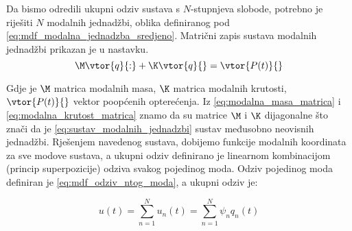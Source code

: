 Da bismo odredili ukupni odziv sustava s $N$-stupnjeva slobode, potrebno je riješiti
$N$ modalnih jednadžbi, oblika definiranog pod \eqref{eq:mdf_modalna_jednadzba_sredjeno}.
Matrični zapis sustava modalnih jednadžbi prikazan je u nastavku.
\begin{equation}\label{eq:sustav_modalnih_jednadzbi}
    \M\vtor{q}{:} + \K\vtor{q}{}=\vtor{P(t)}{}
\end{equation}

Gdje je $\M$ matrica modalnih masa, $\K$ matrica modalnih krutosti, $\vtor{P(t)}{}$
vektor poopćenih opterećenja. Iz \eqref{eq:modalna_masa_matrica} i
\eqref{eq:modalna_krutost_matrica} znamo da su matrice $\M$ i $\K$ dijagonalne što
znači da je \eqref{eq:sustav_modalnih_jednadzbi} sustav međusobno neovisnih jednadžbi.
Rješenjem navedenog sustava, dobijemo funkcije modalnih koordinata za sve modove
sustava, a ukupni odziv definirano je linearnom kombinacijom (princip superpozicije) 
odziva svakog pojedinog moda. Odziv pojedinog moda definiran je
\eqref{eq:mdf_odziv_ntog_moda}, a ukupni odziv je:

\begin{equation}\label{eq:mdf_modalna_ukupno_rjesenje}
    u(t)=\sum_{n=1}^Nu_n(t)=\sum_{n=1}^N\psi_nq_n(t)
\end{equation}
